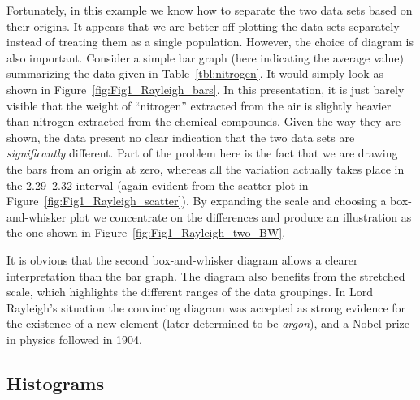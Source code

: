 
Fortunately, in this example we know how to separate the two data sets based on their origins.  
It appears that we are better off plotting the data sets separately instead of treating them as a single population.  
However, the choice of diagram is also important.  Consider a simple bar graph (here indicating 
the average value) summarizing the data given in Table~\ref{tbl:nitrogen}.  It would simply look as 
shown in Figure~\ref{fig:Fig1_Rayleigh_bars}.
	In this presentation, it is just barely visible that the weight of ``nitrogen'' extracted from the air 
is slightly heavier than nitrogen extracted from the chemical compounds.  Given the way they are shown, the 
data present no clear indication that the two data sets are \emph{significantly} different.  Part of the 
problem here is the fact that we are drawing the bars from an origin at zero, whereas all the 
variation actually takes place in the 2.29--2.32 interval (again evident from the scatter plot in Figure~\ref{fig:Fig1_Rayleigh_scatter}).
By expanding the scale and choosing
a box-and-whisker plot we concentrate on the differences and produce an illustration as the one 
shown in Figure~\ref{fig:Fig1_Rayleigh_two_BW}.
 

It is obvious that the second box-and-whisker diagram allows a clearer interpretation than the bar graph. The 
diagram also benefits from the stretched scale, which highlights the different ranges of the data 
groupings.  In Lord Rayleigh's situation the convincing diagram was accepted as strong evidence for the 
existence of a new element (later determined to be \emph{argon}), and a Nobel prize in physics followed in 1904.

\subsection{Histograms}

